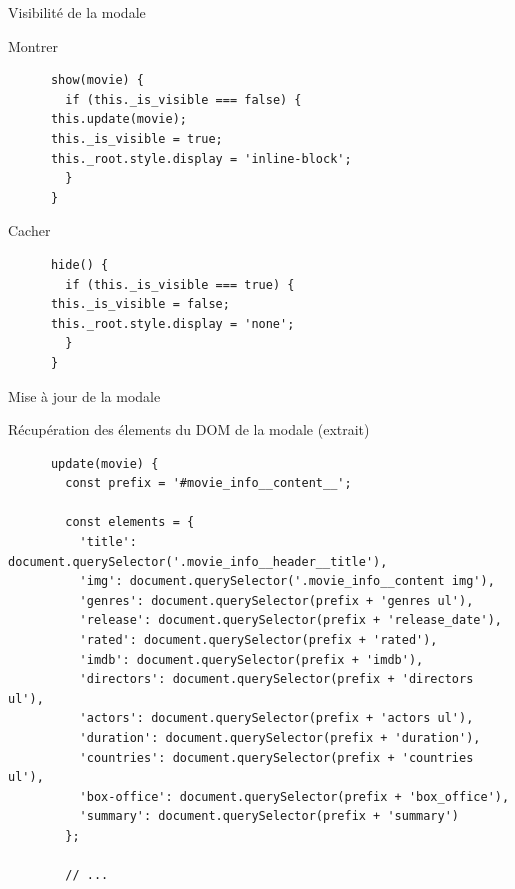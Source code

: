 \begin{frame}[fragile]{Visibilité de la modale}
  \begin{block}{Montrer}
    \tiny
    \begin{verbatim}
      show(movie) {
        if (this._is_visible === false) {
	  this.update(movie);
	  this._is_visible = true;
	  this._root.style.display = 'inline-block';
        }
      }
    \end{verbatim}
  \end{block}

  \begin{block}{Cacher}
    \tiny
    \begin{verbatim}
      hide() {
        if (this._is_visible === true) {
	  this._is_visible = false;
	  this._root.style.display = 'none';
        }
      }
    \end{verbatim}      
  \end{block}
\end{frame}

\begin{frame}[fragile]{Mise à jour de la modale}
  \begin{block}{Récupération des élements du DOM de la modale (extrait)}
    \tiny
    \begin{verbatim}
      update(movie) {
        const prefix = '#movie_info__content__';
        
        const elements = {
          'title': document.querySelector('.movie_info__header__title'),
          'img': document.querySelector('.movie_info__content img'),
          'genres': document.querySelector(prefix + 'genres ul'),
          'release': document.querySelector(prefix + 'release_date'),
          'rated': document.querySelector(prefix + 'rated'),
          'imdb': document.querySelector(prefix + 'imdb'),
          'directors': document.querySelector(prefix + 'directors ul'),
          'actors': document.querySelector(prefix + 'actors ul'),
          'duration': document.querySelector(prefix + 'duration'),
          'countries': document.querySelector(prefix + 'countries ul'),
          'box-office': document.querySelector(prefix + 'box_office'),
          'summary': document.querySelector(prefix + 'summary')
        };

        // ...
    \end{verbatim}
  \end{block}
\end{frame}

